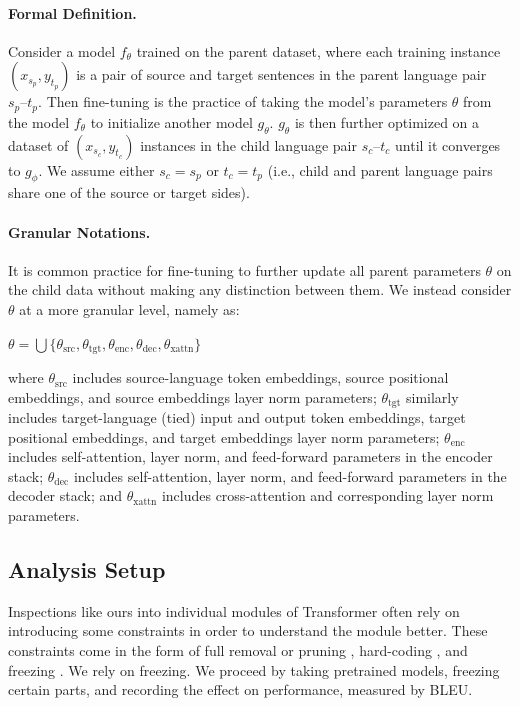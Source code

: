 \paragraph{Formal Definition.} Consider a model $f_\theta$ trained on the parent dataset, where each training instance $(x_{s_p}, y_{t_p})$ is a pair of source and target sentences in the parent language pair $s_p\text{--}t_p$. Then fine-tuning is the practice of taking the model's parameters $\theta$ from the model $f_\theta$ to initialize another model $g_\theta$. $g_\theta$ is then further optimized on a dataset of $(x_{s_c}, y_{t_c})$ instances in the child language pair $s_c\text{--}t_c$ until it converges to $g_\phi$. We assume either $s_c=s_p$ or $t_c=t_p$ (i.e., child and parent language pairs share one of the source or target sides).

\paragraph{Granular Notations.} It is common practice for fine-tuning to further update all parent parameters $\theta$ on the child data without making any distinction between them. We instead consider $\theta$ at a more granular level, namely as:

\begin{center}
    $\theta = \bigcup\{\theta_{\text{src}}, \theta_{\text{tgt}}, \theta_{\text{enc}}, \theta_{\text{dec}}, \theta_{\text{xattn}}\}$
\end{center}

where $\theta_{\text{src}}$ includes source-language token embeddings, source positional embeddings, and source embeddings layer norm parameters; $\theta_{\text{tgt}}$ similarly includes target-language (tied) input and output token embeddings, target positional embeddings, and target embeddings layer norm parameters; $\theta_{\text{enc}}$ includes self-attention, layer norm, and feed-forward parameters in the encoder stack; $\theta_{\text{dec}}$ includes self-attention, layer norm, and feed-forward parameters in the decoder stack; and $\theta_{\text{xattn}}$ includes cross-attention and corresponding layer norm parameters.

\subsection{Analysis Setup}
\label{subsec:analysis}

Inspections like ours into individual modules of Transformer often rely on introducing some constraints in order to understand the module better. These constraints come in the form of full removal or pruning \cite{tang-etal-2019-understanding,voita-etal-2019-analyzing}, hard-coding \cite{you-etal-2020-hard}, and freezing \cite{DBLP:journals/corr/abs-2010-11859}. We rely on freezing. We proceed by taking pretrained models, freezing certain parts, and recording the effect on performance, measured by BLEU.

